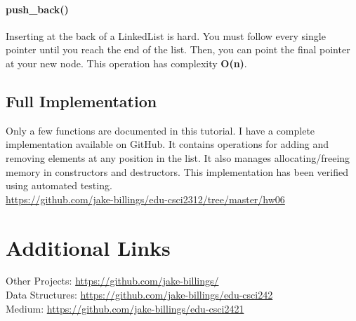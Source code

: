 \documentclass[12pt]{article}
\begin{document}
\paragraph{push\_back()}
Inserting at the back of a LinkedList is hard. You must follow every single pointer until you reach the end of the list. Then, you can point the final pointer at your new node. This operation has complexity \textbf{O(n)}.

\newpage

\subsection{Full Implementation}
Only a few functions are documented in this tutorial. I have a complete implementation available on GitHub. It contains operations for adding and removing elements at any position in the list. It also manages allocating/freeing memory in constructors and destructors. This implementation has been verified using automated testing.\\

\href{https://github.com/jake-billings/edu-csci2312/tree/master/hw06}{https://github.com/jake-billings/edu-csci2312/tree/master/hw06}

\newpage

\section{Additional Links}

\noindent
Other Projects: 
\href{https://github.com/jake-billings/}{https://github.com/jake-billings/}\\

\noindent
Data Structures: \href{https://github.com/jake-billings/edu-csci2421}{https://github.com/jake-billings/edu-csci242}\\

\noindent
Medium: \href{https://github.com/jake-billings/edu-csci2421}{https://github.com/jake-billings/edu-csci2421}
\end{document}
